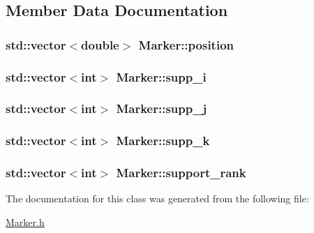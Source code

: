 \subsection{Member Data Documentation}
\subsubsection[{\texorpdfstring{position}{position}}]{\setlength{\rightskip}{0pt plus 5cm}std\+::vector$<$double$>$ Marker\+::position}\hypertarget{class_marker_a988d209a817df43124a100fb54b00b70}{}\label{class_marker_a988d209a817df43124a100fb54b00b70}
\subsubsection[{\texorpdfstring{supp\+\_\+i}{supp_i}}]{\setlength{\rightskip}{0pt plus 5cm}std\+::vector$<$int$>$ Marker\+::supp\+\_\+i}\hypertarget{class_marker_af2b0bab614609f2e9c5bebc1db3f8174}{}\label{class_marker_af2b0bab614609f2e9c5bebc1db3f8174}
\subsubsection[{\texorpdfstring{supp\+\_\+j}{supp_j}}]{\setlength{\rightskip}{0pt plus 5cm}std\+::vector$<$int$>$ Marker\+::supp\+\_\+j}\hypertarget{class_marker_a400ae7b896edf2abe0403dde435b0977}{}\label{class_marker_a400ae7b896edf2abe0403dde435b0977}
\subsubsection[{\texorpdfstring{supp\+\_\+k}{supp_k}}]{\setlength{\rightskip}{0pt plus 5cm}std\+::vector$<$int$>$ Marker\+::supp\+\_\+k}\hypertarget{class_marker_ab06b6d2cfb7221579cf32538f0c79b82}{}\label{class_marker_ab06b6d2cfb7221579cf32538f0c79b82}
\subsubsection[{\texorpdfstring{support\+\_\+rank}{support_rank}}]{\setlength{\rightskip}{0pt plus 5cm}std\+::vector$<$int$>$ Marker\+::support\+\_\+rank}\hypertarget{class_marker_a183752ab41e56b159570a103c25f2aec}{}\label{class_marker_a183752ab41e56b159570a103c25f2aec}


The documentation for this class was generated from the following file\+:\begin{DoxyCompactItemize}
\item 
\hyperlink{_marker_8h}{Marker.\+h}\end{DoxyCompactItemize}
